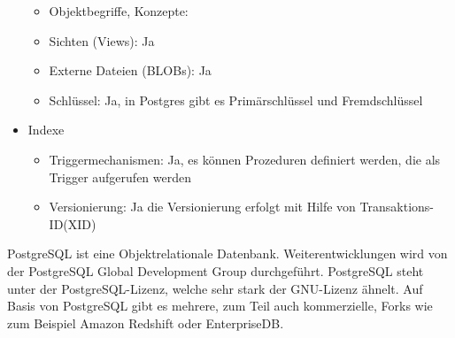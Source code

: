 \begin{itemize}
\begin{itemize}
            \item Objektbegriffe, Konzepte:
            \item Sichten (Views): Ja
            \item Externe Dateien (BLOBs): Ja
            \item Schlüssel: Ja, in Postgres gibt es Primärschlüssel und Fremdschlüssel
        \end{itemize}
        \item Indexe
        \begin{itemize}
            \item Triggermechanismen: Ja, es können Prozeduren definiert werden, die als Trigger aufgerufen werden \cite[Seite 610]{eisentraut01}
            \item Versionierung: Ja die Versionierung erfolgt mit Hilfe von Transaktions-ID(XID) \cite[Seite 38]{froehlich01}
        \end{itemize}
    \end{itemize}
PostgreSQL ist eine Objektrelationale Datenbank. Weiterentwicklungen wird von der PostgreSQL Global Development Group durchgeführt. PostgreSQL steht unter der PostgreSQL-Lizenz, welche sehr stark der GNU-Lizenz ähnelt. Auf Basis von PostgreSQL gibt es mehrere, zum Teil auch kommerzielle, Forks wie zum Beispiel Amazon Redshift oder EnterpriseDB.
